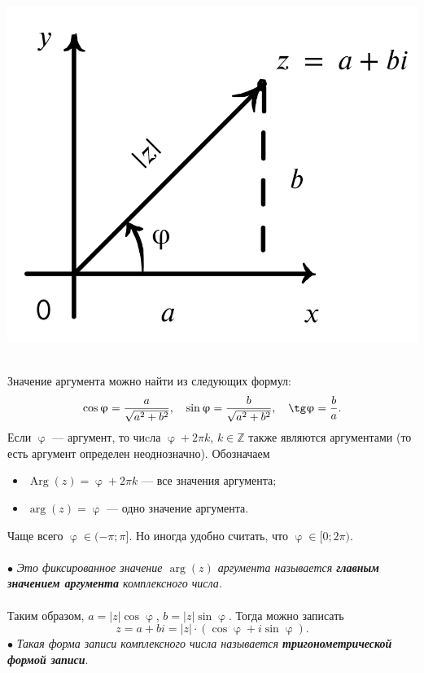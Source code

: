 \documentclass[a4paper, 12pt]{report}
\newcommand{\Z}{\mathbb{Z}}
\renewcommand{\varphi}{\upvarphi}
\begin{document}
\parbox[b][5cm][t]{70mm}{
	\includegraphics[scale=0.38]{pic3.png}}\\
Значение аргумента можно найти из следующих формул:
$$\cos\varphi = \dfrac{a}{\sqrt{a^2 + b^2}},\quad \sin\varphi = \dfrac{b}{\sqrt{a^2 + b^2}},\quad \tg \varphi = \dfrac{b}{a}.$$
Если $\varphi$ --- аргумент, то чиcла $\varphi + 2\pi k$, $k\in \Z$ также являются аргументами (то есть аргумент определен неоднозначно). Обозначаем \begin{itemize}
	\item $\operatorname{Arg}(z) = \varphi + 2\pi k$ --- все значения аргумента;
	\item $\arg (z) = \varphi$ --- одно значение аргумента.
\end{itemize}
Чаще всего $\varphi \in (-\pi; \pi]$. Но иногда удобно считать, что $\varphi \in [0;2\pi)$.\\\\
$\bullet$ \textit{Это фиксированное значение $\arg (z)$ аргумента  называется \textbf{главным значением аргумента} комплексного числа.}\\\\
Таким образом, $a = |z|\cos \varphi$, $b = |z|\sin\varphi$. Тогда можно записать $$z = a + bi = |z|\cdot (\cos \varphi + i\sin\varphi).$$
$\bullet$ \textit{Такая форма записи комплексного числа называется \textbf{тригонометрической формой записи}}.\\\\
\end{document}
